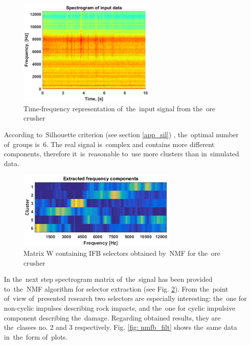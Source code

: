 \begin{figure}[!ht]
\centering
\includegraphics[width = 0.6\textwidth]{wykresy/nmfb_spec}
\caption{Time-frequency representation of~the~input signal from the~ore crusher}
\label{fig: nmfb_spec}
\end{figure}

According to~Silhouette criterion (see section \ref{app_sil}) \cite{kaufman2009finding,rousseeuw1987silhouettes}, the~optimal number of~groups is~6. The real signal is~complex and contains more different components, therefore it~is~reasonable to~use more clusters than in~simulated data.

\begin{figure}[!ht]
\centering
\includegraphics[width = 0.7\textwidth]{wykresy/nmfb_profiles}
\caption{Matrix W containing IFB selectors obtained by~NMF for the~ore crusher}
\label{fig: nmfb_profiles}
\end{figure}

In the~next step spectrogram matrix of~the~signal has been provided to~the~NMF algorithm for selector extraction (see Fig. \ref{fig: nmfb_profiles}). From the~point of~view of~presented research two selectors are especially interesting: the~one for non-cyclic impulses describing rock impacts, and the~one for cyclic impulsive component describing the~damage. Regarding obtained results, they are the~classes no. 2 and 3 respectively. Fig. \ref{fig: nmfb_filt} shows the~same data in~the~form of~plots.

